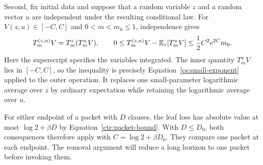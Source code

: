 Second, fix initial data and suppose that a random variable $z$ and a
random vector $u$ are independent under the resulting conditional law.
For $V(z,u)\in[-C,C]$ and $0<m<m_0\le1$, independence gives
\[
 T_m^{(z,u)}V=T_m^z(T_m^uV),
 \qquad
 0\le T_m^{(z,u)}V-\mathbb E_z[T_m^uV]
 \le\frac12C^2e^{2C}m_0.
\]
Here the superscript specifies the variables integrated. The inner
quantity $T_m^uV$ lies in $[-C,C]$, so the inequality is precisely
Equation~\eqref{cs:small-exponent} applied to the outer operation. It
replaces one small-parameter logarithmic average over $z$ by ordinary
expectation while retaining the logarithmic average over $u$.

For either endpoint of a packet with $D$ clauses, the leaf loss has
absolute value at most $\log2+\beta D$ by
Equation~\eqref{ctr:packet-bound}. With $D\le D_0$, both consequences
therefore apply with $C=\log2+\beta D_0$. They compare one packet at
each endpoint. The removal argument will reduce a long horizon to one
packet before invoking them.
